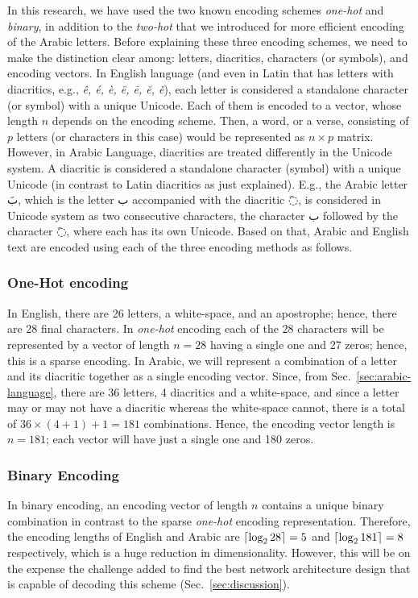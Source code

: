 In this research, we have used the two known encoding schemes \textit{one-hot} and \textit{binary},
in addition to the \textit{two-hot} that we introduced for more efficient encoding of the Arabic
letters. Before explaining these three encoding schemes, we need to make the distinction clear
among: letters, diacritics, characters (or symbols), and encoding vectors. In English language (and
even in Latin that has letters with diacritics, e.g., \textit{ê, é, è, ë, ē, ĕ, ě}), each letter is
considered a standalone character (or symbol) with a unique Unicode. Each of them is encoded to a
vector, whose length $n$ depends on the encoding scheme. Then, a word, or a verse, consisting of $p$
letters (or characters in this case) would be represented as $n \times p$ matrix. However, in Arabic
Language, diacritics are treated differently in the Unicode system. A diacritic is considered a
standalone character (symbol) with a unique Unicode (in contrast to Latin diacritics as just
explained). E.g., the Arabic letter \textarabic{بَ}, which is the letter \textarabic{ب} accompanied
with the diacritic \textarabic{◌َ}, is considered in Unicode system as two consecutive characters,
the character \textarabic{ب} followed by the character \textarabic{◌َ}, where each has its own
Unicode. Based on that, Arabic and English text are encoded using each of the three encoding methods
as follows.

\bigskip

\subsubsection{One-Hot encoding}\label{sec:one-hot-encoding}
In English, there are 26 letters, a white-space, and an apostrophe; hence, there are 28 final
characters. In \textit{one-hot} encoding each of the 28 characters will be represented by a vector
of length $n=28$ having a single one and 27 zeros; hence, this is a sparse encoding. In Arabic, we
will represent a combination of a letter and its diacritic together as a single encoding
vector. Since, from Sec.~\ref{sec:arabic-language}, there are 36 letters, 4 diacritics and a
white-space, and since a letter may or may not have a diacritic whereas the white-space cannot,
there is a total of $36 \times (4+1) + 1 = 181$ combinations. Hence, the encoding vector length is
$n=181$; each vector will have just a single one and 180 zeros.


\subsubsection{Binary Encoding}\label{sec:binary-encoding}
In binary encoding, an encoding vector of length $n$ contains a unique binary combination in
contrast to the sparse \textit{one-hot} encoding representation. Therefore, the encoding lengths of
English and Arabic are $\lceil\log_2 28\rceil = 5$ and $\lceil\log_2 181\rceil = 8$ respectively, which is a
huge reduction in dimensionality. However, this will be on the expense the challenge added to find
the best network architecture design that is capable of decoding this scheme
(Sec.~\ref{sec:discussion}).


